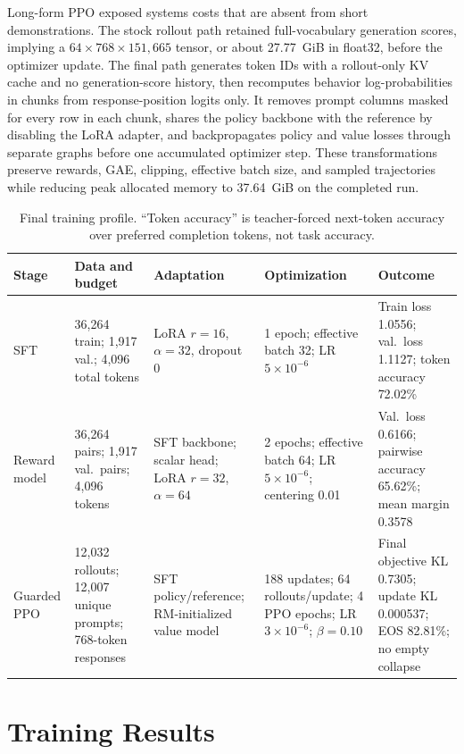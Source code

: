 \documentclass[10pt,twocolumn]{article}
\begin{document}
Long-form PPO exposed systems costs that are absent from short demonstrations.
The stock rollout path retained full-vocabulary generation scores, implying a
$64\times768\times151{,}665$ tensor, or about 27.77~GiB in float32, before the
optimizer update. The final path generates token IDs with a rollout-only KV
cache and no generation-score history, then recomputes behavior
log-probabilities in chunks from response-position logits only. It removes
prompt columns masked for every row in each chunk, shares the policy backbone
with the reference by disabling the LoRA adapter, and backpropagates policy and
value losses through separate graphs before one accumulated optimizer step.
These transformations preserve rewards, GAE, clipping, effective batch size,
and sampled trajectories while reducing peak allocated memory to 37.64~GiB on
the completed run.

\begin{table}[t]
\centering
\small
\caption{Final training profile. ``Token accuracy'' is teacher-forced
next-token accuracy over preferred completion tokens, not task accuracy.}
\label{tab:training}
\begin{tabularx}{0.97\textwidth}{@{}lYYYY@{}}
\toprule
\textbf{Stage} & \textbf{Data and budget} & \textbf{Adaptation} &
\textbf{Optimization} & \textbf{Outcome}\\
\midrule
SFT &
36,264 train; 1,917 val.; 4,096 total tokens &
LoRA $r=16$, $\alpha=32$, dropout 0 &
1 epoch; effective batch 32; LR $5{\times}10^{-6}$ &
Train loss 1.0556; val.\ loss 1.1127; token accuracy 72.02\%\\
Reward model &
36,264 pairs; 1,917 val.\ pairs; 4,096 tokens &
SFT backbone; scalar head; LoRA $r=32$, $\alpha=64$ &
2 epochs; effective batch 64; LR $5{\times}10^{-6}$; centering 0.01 &
Val.\ loss 0.6166; pairwise accuracy 65.62\%; mean margin 0.3578\\
Guarded PPO &
12,032 rollouts; 12,007 unique prompts; 768-token responses &
SFT policy/reference; RM-initialized value model &
188 updates; 64 rollouts/update; 4 PPO epochs; LR $3{\times}10^{-6}$;
$\beta=0.10$ &
Final objective KL 0.7305; update KL 0.000537; EOS 82.81\%; no empty collapse\\
\bottomrule
\end{tabularx}
\end{table}

\section{Training Results}
\end{document}
